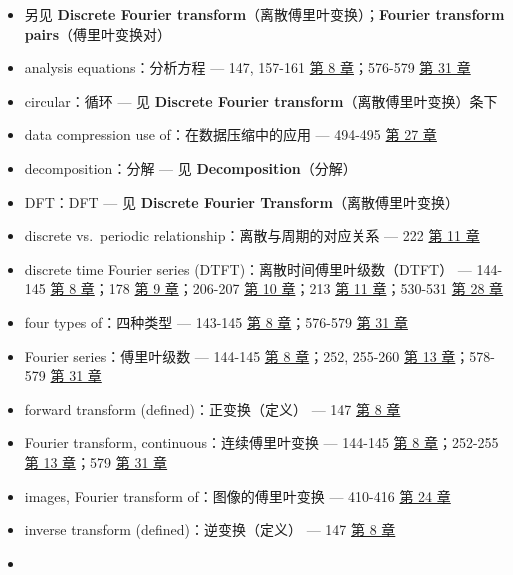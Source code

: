 \begin{itemize}
  \begin{itemize}
  \tightlist
  \item
    另见 \textbf{Discrete Fourier
    transform}（离散傅里叶变换）；\textbf{Fourier transform
    pairs}（傅里叶变换对）
  \item
    analysis equations：分析方程 --- 147, 157-161 
    \hyperref[ch-08]{第 8 章}；576-579  \hyperref[ch-31]{第 31
    章}
  \item
    circular：循环 --- 见 \textbf{Discrete Fourier
    transform}（离散傅里叶变换）条下
  \item
    data compression use of：在数据压缩中的应用 --- 494-495 
    \hyperref[ch-27]{第 27 章}
  \item
    decomposition：分解 --- 见 \textbf{Decomposition}（分解）
  \item
    DFT：DFT --- 见 \textbf{Discrete Fourier
    Transform}（离散傅里叶变换）
  \item
    discrete vs.~periodic relationship：离散与周期的对应关系 --- 222
     \hyperref[ch-11]{第 11 章}
  \item
    discrete time Fourier series (DTFT)：离散时间傅里叶级数（DTFT） ---
    144-145  \hyperref[ch-08]{第 8 章}；178 
    \hyperref[ch-09]{第 9 章}；206-207  \hyperref[ch-10]{第 10
    章}；213  \hyperref[ch-11]{第 11 章}；530-531 
    \hyperref[ch-28]{第 28 章}
  \item
    four types of：四种类型 --- 143-145  \hyperref[ch-08]{第 8
    章}；576-579  \hyperref[ch-31]{第 31 章}
  \item
    Fourier series：傅里叶级数 --- 144-145 
    \hyperref[ch-08]{第 8 章}；252, 255-260 
    \hyperref[ch-13]{第 13 章}；578-579  \hyperref[ch-31]{第
    31 章}
  \item
    forward transform (defined)：正变换（定义） --- 147 
    \hyperref[ch-08]{第 8 章}
  \item
    Fourier transform, continuous：连续傅里叶变换 --- 144-145 
    \hyperref[ch-08]{第 8 章}；252-255  \hyperref[ch-13]{第 13
    章}；579  \hyperref[ch-31]{第 31 章}
  \item
    images, Fourier transform of：图像的傅里叶变换 --- 410-416
     \hyperref[ch-24]{第 24 章}
  \item
    inverse transform (defined)：逆变换（定义） --- 147 
    \hyperref[ch-08]{第 8 章}
  \item

\end{itemize}
\end{itemize}
